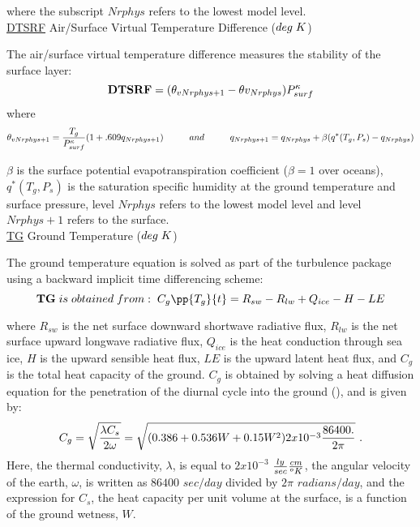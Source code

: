 \noindent
where the subscript $Nrphys$ refers to the lowest model level.
\\
 
\noindent
{ \underline {DTSRF}  Air/Surface Virtual Temperature Difference ($deg \hspace{.1cm} K$) }

\noindent
The air/surface virtual temperature difference measures the stability of the surface layer:
\[
{\bf DTSRF} = (\theta_{v{Nrphys+1}} - \theta{v_{Nrphys}}) P^{\kappa}_{surf}
\]
\noindent
where
\[
\theta_{v{Nrphys+1}} = { T_g \over {P^{\kappa}_{surf}} } (1 + .609 q_{Nrphys+1}) \hspace{1cm}
and \hspace{1cm} q_{Nrphys+1} = q_{Nrphys} + \beta(q^*(T_g,P_s) - q_{Nrphys})
\]

\noindent
$\beta$ is the surface potential evapotranspiration coefficient ($\beta=1$ over oceans),
$q^*(T_g,P_s)$ is the saturation specific humidity at the ground temperature 
and surface pressure, level $Nrphys$ refers to the lowest model level and level $Nrphys+1$ 
refers to the surface.
\\

 
\noindent
{ \underline {TG}  Ground Temperature ($deg \hspace{.1cm} K$) }

\noindent
The ground temperature equation is solved as part of the turbulence package
using a backward implicit time differencing scheme:
\[
{\bf TG} \hspace{.1cm} is \hspace{.1cm} obtained \hspace{.1cm} from: \hspace{.1cm}
C_g\pp{T_g}{t} = R_{sw} - R_{lw} + Q_{ice} - H - LE
\]

\noindent
where $R_{sw}$ is the net surface downward shortwave radiative flux, $R_{lw}$ is the
net surface upward longwave radiative flux, $Q_{ice}$ is the heat conduction through
sea ice, $H$ is the upward sensible heat flux, $LE$ is the upward latent heat
flux, and $C_g$ is the total heat capacity of the ground. 
$C_g$ is obtained by solving a heat diffusion equation 
for the penetration of the diurnal cycle into the ground (\cite{black:77}), and is given by:
\[
C_g = \sqrt{ {\lambda C_s \over {2 \omega} } } = \sqrt{(0.386 + 0.536W + 0.15W^2)2x10^{-3}
{ 86400. \over {2 \pi} } } \, \, .
\]
\noindent
Here, the thermal conductivity, $\lambda$, is equal to $2x10^{-3}$ ${ly\over{ sec}} 
{cm \over {^oK}}$, 
the angular velocity of the earth, $\omega$, is written as $86400$ $sec/day$ divided 
by $2 \pi$ $radians/
day$, and the expression for $C_s$, the heat capacity per unit volume at the surface, 
is a function of the ground wetness, $W$. 
\\

